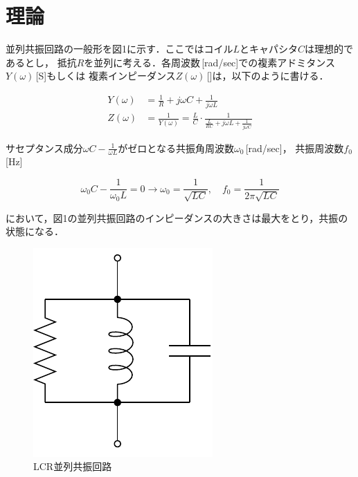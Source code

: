 
\section{理論}

並列共振回路の一般形を図1に示す．ここではコイル$L$とキャパシタ$C$は理想的であるとし，
抵抗$R$を並列に考える．各周波数\omega\,[rad/sec]での複素アドミタンス$Y(\omega)$\,[S]もしくは
複素インピーダンス$Z(\omega)$\,[\Omega]は，以下のように書ける．

$$
\begin{aligned}
Y(\omega) &=\frac{1}{R}+j \omega C+\frac{1}{j \omega L} \\
Z(\omega) &=\frac{1}{Y(\omega)}=\frac{L}{C} \cdot \frac{1}{\frac{L}{R C}+j \omega L+\frac{1}{j \omega C}}
\end{aligned}
$$

サセプタンス成分$\omega C-\frac{1}{\omega L}$がゼロとなる共振角周波数$\omega_0$\,[rad/sec]，
共振周波数$f_0$\,[Hz]

$$
\omega_0 C-\frac{1}{\omega_0 L}=0 \longrightarrow \omega_0=\frac{1}{\sqrt{L C}}, \quad f_0=\frac{1}{2 \pi \sqrt{L C}}
$$

において，図1の並列共振回路のインピーダンスの大きさは最大をとり，共振の状態になる．

\begin{figure}[H]
    \begin{center}
        \includegraphics[]{figure1.drawio.pdf}
        \caption{LCR並列共振回路}
    \end{center}
\end{figure}

